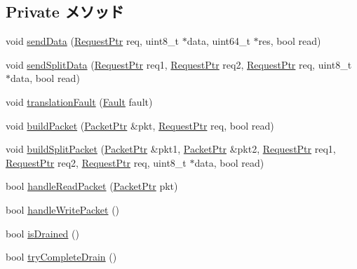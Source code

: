 \subsection*{Private メソッド}
\begin{DoxyCompactItemize}
\item 
void \hyperlink{classTimingSimpleCPU_ad6486c2f7c95532e093a31f013b36fe5}{sendData} (\hyperlink{classRequest}{RequestPtr} req, uint8\_\-t $\ast$data, uint64\_\-t $\ast$res, bool read)
\item 
void \hyperlink{classTimingSimpleCPU_a0894ae25efe60dc7855c057cab1684f9}{sendSplitData} (\hyperlink{classRequest}{RequestPtr} req1, \hyperlink{classRequest}{RequestPtr} req2, \hyperlink{classRequest}{RequestPtr} req, uint8\_\-t $\ast$data, bool read)
\item 
void \hyperlink{classTimingSimpleCPU_a5f6223adc354c36cc8773251dd7e0f4d}{translationFault} (\hyperlink{classRefCountingPtr}{Fault} fault)
\item 
void \hyperlink{classTimingSimpleCPU_aefe7c644107e54e9aa677838cd1a947f}{buildPacket} (\hyperlink{classPacket}{PacketPtr} \&pkt, \hyperlink{classRequest}{RequestPtr} req, bool read)
\item 
void \hyperlink{classTimingSimpleCPU_a1a7d0ff7c4efb80ffd4f53439b2291f8}{buildSplitPacket} (\hyperlink{classPacket}{PacketPtr} \&pkt1, \hyperlink{classPacket}{PacketPtr} \&pkt2, \hyperlink{classRequest}{RequestPtr} req1, \hyperlink{classRequest}{RequestPtr} req2, \hyperlink{classRequest}{RequestPtr} req, uint8\_\-t $\ast$data, bool read)
\item 
bool \hyperlink{classTimingSimpleCPU_a9a8beb0dcad34e8759794cea6639f715}{handleReadPacket} (\hyperlink{classPacket}{PacketPtr} pkt)
\item 
bool \hyperlink{classTimingSimpleCPU_a8d70b3b102cd0f4949ae31e84ee2eb98}{handleWritePacket} ()
\item 
bool \hyperlink{classTimingSimpleCPU_ac166e5bc3ddf730beb1282cf821096ae}{isDrained} ()
\item 
bool \hyperlink{classTimingSimpleCPU_abfea8f75a7a7480716801affeebbe87b}{tryCompleteDrain} ()
\end{DoxyCompactItemize}
